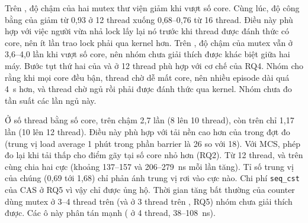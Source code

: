 Trên , độ chậm của hai mutex thư viện giảm khi vượt số core. Cùng lúc, độ công bằng của
 giảm từ 0,93 ở 12 thread xuống 0,68--0,76 từ 16 thread. Điều này phù hợp với việc người
vừa nhả lock lấy lại nó trước khi thread được đánh thức có core, nên ít lần trao lock phải qua kernel hơn.
Trên , độ chậm của mutex vẫn ở 3,6--4,0 lần khi vượt số core, nên nhóm chưa giải thích
được khác biệt giữa hai máy. Bước tụt thứ hai của  và  ở 12 thread
phù hợp với cơ chế của RQ4. Nhóm cho rằng khi mọi core đều bận, thread chờ dễ mất core, nên nhiều episode
dài quá 4~\textmu s hơn, và thread chờ ngủ rồi phải được đánh thức qua kernel. Nhóm chưa đo tần suất các
lần ngủ này.

Ở số thread bằng số core,  trên  chậm 2,7 lần (8 lên 10 thread), còn trên
 chỉ 1,17 lần (10 lên 12 thread). Điều này phù hợp với tải nền cao hơn của
 trong đợt đo (trung vị load average 1 phút trong phần barrier là 26 so với 18). Với MCS, phép đo lại khi tải
thấp cho điểm gãy tại số core nhỏ hơn (RQ2). Từ 12 thread,  và  trên
 cùng chia hai cực (khoảng 137--157 và 206--279~ns mỗi lần tăng). Tỉ số trung vị của
chúng (0,69 tới 1,68) chỉ phản ánh trung vị rơi vào cực nào. Chi phí \texttt{seq\_cst} của CAS ở RQ5 vì
vậy chỉ được  ủng hộ. Thời gian tăng bất thường của counter dùng mutex ở 3--4 thread
trên  (và ở 3 thread trên , RQ5) nhóm chưa giải thích được. Các ô
này phân tán mạnh ( ở 4 thread, 38--108~ns).

